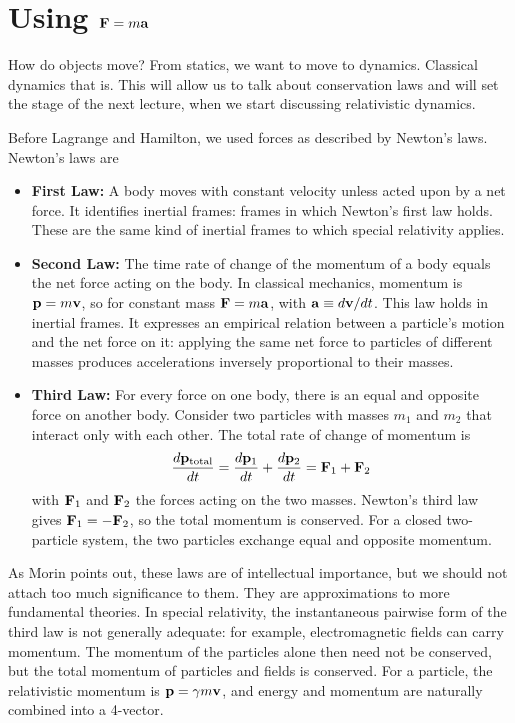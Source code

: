 \documentclass[12pt]{article}
\newcommand{\be}{\begin{eqnarray}}
\newcommand{\ee}{\end{eqnarray}}
\begin{document}
\section{Using ${\bf F} = m {\bf a}$}

How do objects move? From statics, we want to move to dynamics. Classical dynamics that is. This will allow us to talk about conservation laws and will set the stage of the next lecture, when we start discussing relativistic dynamics. 

Before Lagrange and Hamilton, we used forces as described by Newton's laws. 
Newton's laws are 
\begin{itemize}
\item {\bf First Law:} A body moves with constant velocity unless acted upon by a net force. It identifies inertial frames: frames in which Newton's first law holds. These are the same kind of inertial frames to which special relativity applies.
\item {\bf Second Law:} The time rate of change of the momentum of a body equals the net force acting on the body. In classical mechanics, momentum is ${\bf p}=m{\bf v}$, so for constant mass ${\bf F}=m{\bf a}$, with ${\bf a}\equiv d{\bf v}/dt$. This law holds in inertial frames. It expresses an empirical relation between a particle's motion and the net force on it: applying the same net force to particles of different masses produces accelerations inversely proportional to their masses.
\item {\bf Third Law:} For every force on one body, there is an equal and opposite force on another body. Consider two particles with masses $m_1$ and $m_2$ that interact only with each other. The total rate of change of momentum is
\be
\frac{d{\bf p}_{\rm total}}{dt} = \frac{d{\bf p}_{1}}{dt} + \frac{d{\bf p}_{2}}{dt} = {\bf F}_1 + {\bf F}_2 
\ee
with ${\bf F}_1$ and ${\bf F}_2$ the forces acting on the two masses. Newton's third law gives ${\bf F}_1=-{\bf F}_2$, so the total momentum is conserved. For a closed two-particle system, the two particles exchange equal and opposite momentum.
\end{itemize}
As Morin points out, these laws are of intellectual importance, but we should not attach too much significance to them. They are approximations to more fundamental theories. In special relativity, the instantaneous pairwise form of the third law is not generally adequate: for example, electromagnetic fields can carry momentum. The momentum of the particles alone then need not be conserved, but the total momentum of particles and fields is conserved. For a particle, the relativistic momentum is ${\bf p}=\gamma m{\bf v}$, and energy and momentum are naturally combined into a 4-vector.
\end{document}
